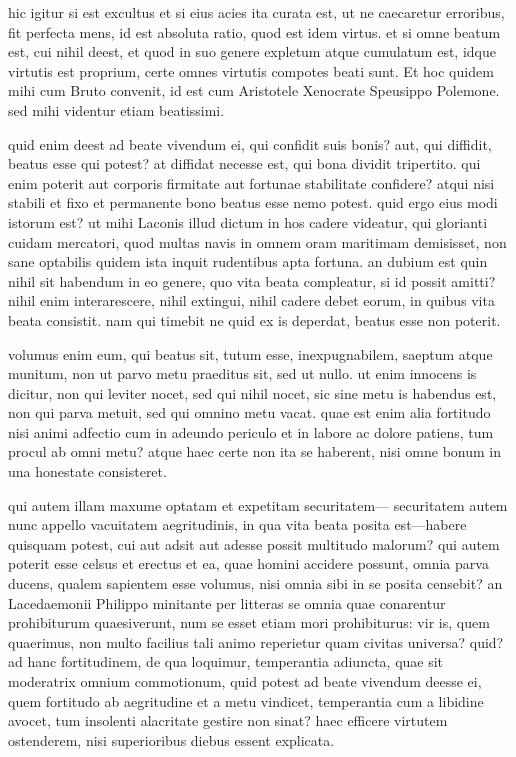  hic igitur si est excultus et si eius acies ita curata est, ut ne caecaretur erroribus, fit perfecta mens, id est absoluta ratio, quod est idem virtus. et si omne beatum est, cui nihil deest, et quod in suo genere expletum atque cumulatum est, idque virtutis est proprium, certe omnes virtutis compotes beati sunt. Et hoc quidem mihi cum Bruto convenit, id est cum Aristotele Xenocrate Speusippo Polemone. sed mihi videntur etiam beatissimi.

 quid enim deest ad beate vivendum ei, qui confidit suis bonis? aut, qui diffidit, beatus esse qui potest? at diffidat necesse est, qui bona dividit tripertito. qui enim poterit aut corporis firmitate aut fortunae stabilitate confidere? atqui nisi stabili et fixo et permanente bono beatus esse nemo potest. quid ergo eius modi istorum est? ut mihi Laconis illud dictum in hos cadere videatur, qui glorianti cuidam mercatori, quod multas navis in omnem oram maritimam demisisset, non sane optabilis quidem ista inquit rudentibus apta fortuna. an dubium est quin nihil sit habendum in eo genere, quo vita beata compleatur, si id possit amitti? nihil enim interarescere, nihil extingui, nihil cadere debet eorum, in quibus vita beata consistit. nam qui timebit ne quid ex is deperdat, beatus esse non poterit.

 volumus enim eum, qui beatus sit, tutum esse, inexpugnabilem, saeptum atque munitum, non ut parvo metu praeditus sit, sed ut nullo. ut enim innocens is dicitur, non qui leviter nocet, sed qui nihil nocet, sic sine metu is habendus est, non qui parva metuit, sed qui omnino metu vacat. quae est enim alia fortitudo nisi animi adfectio cum in adeundo periculo et in labore ac dolore patiens, tum procul ab omni metu? atque haec certe non ita se haberent, nisi omne bonum in una honestate consisteret.

 qui autem illam maxume optatam et expetitam securitatem— securitatem autem nunc appello vacuitatem aegritudinis, in qua vita beata posita est—habere quisquam potest, cui aut adsit aut adesse possit multitudo malorum? qui autem poterit esse celsus et erectus et ea, quae homini accidere possunt, omnia parva ducens, qualem sapientem esse volumus, nisi omnia sibi in se posita censebit? an Lacedaemonii Philippo minitante per litteras se omnia quae conarentur prohibiturum quaesiverunt, num se esset etiam mori prohibiturus: vir is, quem quaerimus, non multo facilius tali animo reperietur quam civitas universa? quid? ad hanc fortitudinem, de qua loquimur, temperantia adiuncta, quae sit moderatrix omnium commotionum, quid potest ad beate vivendum deesse ei, quem fortitudo ab aegritudine et a metu vindicet, temperantia cum a libidine avocet, tum insolenti alacritate gestire non sinat? haec efficere virtutem ostenderem, nisi superioribus diebus essent explicata.

